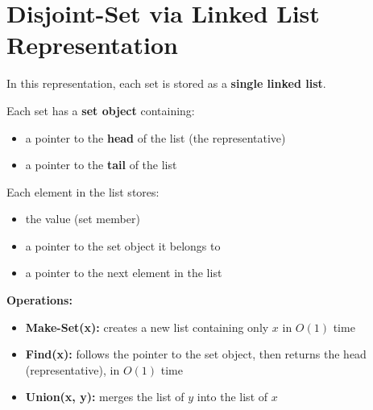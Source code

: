 \documentclass[11pt,a4paper,openany]{book}
\begin{document}
\vspace{2cm}





\section{Disjoint-Set via Linked List Representation}





\begin{defnbox}[title=Disjoint-Set via Linked List Representation]
In this representation, each set is stored as a \textbf{single linked list}.

Each set has a \textbf{set object} containing:
\begin{itemize}
    \item a pointer to the \textbf{head} of the list (the representative)
    \item a pointer to the \textbf{tail} of the list
\end{itemize}

Each element in the list stores:
\begin{itemize}
    \item the value (set member)
    \item a pointer to the set object it belongs to
    \item a pointer to the next element in the list
\end{itemize}

\textbf{Operations:}
\begin{itemize}
    \item \textbf{Make-Set(x):} creates a new list containing only $x$ in $O(1)$ time
    \item \textbf{Find(x):} follows the pointer to the set object, then returns the head (representative), in $O(1)$ time
    \item \textbf{Union(x, y):} merges the list of $y$ into the list of $x$
\end{itemize}
\end{defnbox}
\end{document}
